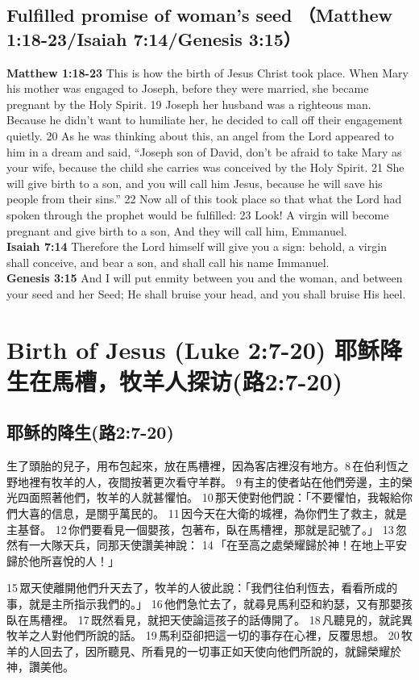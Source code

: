 \subsection{Fulfilled promise of woman's seed （Matthew 1:18-23/Isaiah 7:14/Genesis 3:15）}
\textbf{Matthew 1:18-23} This is how the birth of Jesus Christ took place. When Mary his mother was engaged to Joseph, before they were married, she became pregnant by the Holy Spirit. 19 Joseph her husband was a righteous man. Because he didn’t want to humiliate her, he decided to call off their engagement quietly. 20 As he was thinking about this, an angel from the Lord appeared to him in a dream and said, “Joseph son of David, don’t be afraid to take Mary as your wife, because the child she carries was conceived by the Holy Spirit. 21 She will give birth to a son, and you will call him Jesus, because he will save his people from their sins.” 22 Now all of this took place so that what the Lord had spoken through the prophet would be fulfilled:
23 Look! A virgin will become pregnant and give birth to a son, And they will call him, Emmanuel.\\
\textbf{Isaiah 7:14} Therefore the Lord himself will give you a sign: behold, a virgin shall conceive, and bear a son, and shall call his name Immanuel.\\
\textbf{Genesis 3:15} And I will put enmity between you and the woman, and between your seed and her Seed; He shall bruise your head, and you shall bruise His heel.



\section{Birth of Jesus (Luke 2:7-20) 耶稣降生在馬槽，牧羊人探访(路2:7-20)}
\subsection{耶稣的降生(路2:7-20)}
生了頭胎的兒子，用布包起來，放在馬槽裡，因為客店裡沒有地方。8 在伯利恆之野地裡有牧羊的人，夜間按著更次看守羊群。 9 有主的使者站在他們旁邊，主的榮光四面照著他們，牧羊的人就甚懼怕。 10 那天使對他們說：「不要懼怕，我報給你們大喜的信息，是關乎萬民的。 11 因今天在大衛的城裡，為你們生了救主，就是主基督。 12 你們要看見一個嬰孩，包著布，臥在馬槽裡，那就是記號了。」 13 忽然有一大隊天兵，同那天使讚美神說： 14 「在至高之處榮耀歸於神！在地上平安歸於他所喜悅的人！」

15 眾天使離開他們升天去了，牧羊的人彼此說：「我們往伯利恆去，看看所成的事，就是主所指示我們的。」 16 他們急忙去了，就尋見馬利亞和約瑟，又有那嬰孩臥在馬槽裡。 17 既然看見，就把天使論這孩子的話傳開了。 18 凡聽見的，就詫異牧羊之人對他們所說的話。 19 馬利亞卻把這一切的事存在心裡，反覆思想。 20 牧羊的人回去了，因所聽見、所看見的一切事正如天使向他們所說的，就歸榮耀於神，讚美他。

